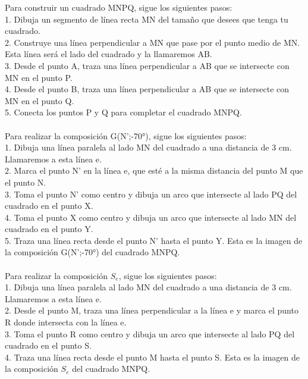 \documentclass{article}
\begin{document}
Para construir un cuadrado MNPQ, sigue los siguientes pasos:\\
1. Dibuja un segmento de línea recta MN del tamaño que desees que tenga tu cuadrado.\\
2. Construye una línea perpendicular a MN que pase por el punto medio de MN. Esta línea será el lado del cuadrado y la llamaremos AB.\\
3. Desde el punto A, traza una línea perpendicular a AB que se intersecte con MN en el punto P.\\
4. Desde el punto B, traza una línea perpendicular a AB que se intersecte con MN en el punto Q.\\
5. Conecta los puntos P y Q para completar el cuadrado MNPQ.\\
\\
Para realizar la composición G(N’;-70°), sigue los siguientes pasos:\\
1. Dibuja una línea paralela al lado MN del cuadrado a una distancia de 3 cm. Llamaremos a esta línea e.\\
2. Marca el punto N' en la línea e, que esté a la misma distancia del punto M que el punto N.\\
3. Toma el punto N' como centro y dibuja un arco que intersecte al lado PQ del cuadrado en el punto X.\\
4. Toma el punto X como centro y dibuja un arco que intersecte al lado MN del cuadrado en el punto Y.\\
5. Traza una línea recta desde el punto N' hasta el punto Y. Esta es la imagen de la composición G(N’;-70°) del cuadrado MNPQ.\\
\\
Para realizar la composición $S_e$, sigue los siguientes pasos:\\
1. Dibuja una línea paralela al lado MN del cuadrado a una distancia de 3 cm. Llamaremos a esta línea e.\\
2. Desde el punto M, traza una línea perpendicular a la línea e y marca el punto R donde intersecta con la línea e.\\
3. Toma el punto R como centro y dibuja un arco que intersecte al lado PQ del cuadrado en el punto S.\\
4. Traza una línea recta desde el punto M hasta el punto S. Esta es la imagen de la composición $S_e$ del cuadrado MNPQ.\\
\end{document}
